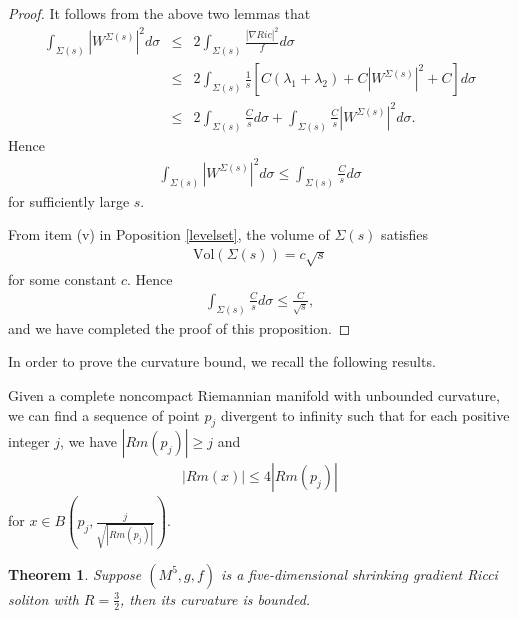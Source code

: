 \documentclass[12pt]{amsart}
\newcommand{\ban}{\begin{eqnarray*}}
\newcommand{\ean}{\end{eqnarray*}}
\newtheorem{theo}{Theorem}[section]
\begin{document}
\begin{proof}
	It follows from the above two lemmas that
	\ban
	\int_{\Sigma(s)}|W^{\Sigma(s)}|^2d\sigma&\leq& 2\int_{\Sigma(s)}{\frac{|\nabla Ric|^2}{f}}d\sigma\\
	&\leq&2\int_{\Sigma(s)}\frac{1}{s}\left[ C(\lambda_{1}+\lambda_{2})+C|W^{\Sigma(s)}|^2+C\right] d\sigma\\
	&\leq&2\int_{\Sigma(s)}\frac{C}{s}d\sigma +\int_{\Sigma(s)} \frac{C}{s}|W^{\Sigma(s)}|^2d\sigma.
	\ean
 Hence
	\ban
	\int_{\Sigma(s)}|W^{\Sigma(s)}|^2d\sigma\leq \int_{\Sigma(s)}\frac{C}{s}d\sigma
	\ean
	for sufficiently large $s$.
	
	From item (v) in Poposition \ref{levelset}, the volume of $\Sigma(s)$ satisfies
	\ban
	\text{Vol}(\Sigma(s))=c\sqrt{s}
	\ean
	for some constant $c$.
	Hence
	\ban
	\int_{\Sigma(s)}\frac{C}{s}d\sigma\leq \frac{C}{\sqrt{s}},
	\ean
	and we have completed the proof of this proposition.
\end{proof}

In order to prove the curvature bound, we recall the following results.
\begin{lem}\label{point picking}
	Given a complete noncompact Riemannian manifold with unbounded curvature, we can find a sequence of point $p_j$ divergent to infinity such that for each positive integer $j$, we have $|Rm(p_j)|\geq j$ and
	\ban
	|Rm(x)|\leq 4 |Rm(p_j)|
	\ean
	for $x\in B(p_j, \frac{j}{\sqrt{|Rm(p_j)|}})$.
\end{lem}

\begin{theo}\label{bounded curvature}Suppose $(M^5, g, f)$ is a five-dimensional shrinking gradient Ricci soliton with $R=\frac{3}{2}$, then its curvature is bounded.
\end{theo}
\end{document}
